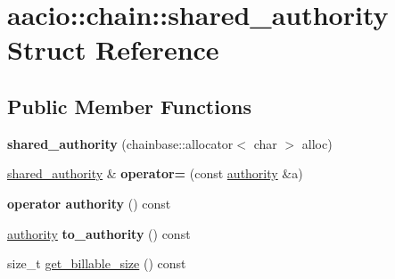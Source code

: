 \hypertarget{structaacio_1_1chain_1_1shared__authority}{}\section{aacio\+:\+:chain\+:\+:shared\+\_\+authority Struct Reference}
\label{structaacio_1_1chain_1_1shared__authority}
\subsection*{Public Member Functions}
\begin{DoxyCompactItemize}
\item 
\mbox{\label{structaacio_1_1chain_1_1shared__authority_a07b251036ed4de19aadd3fe8bc2841b3}} 
{\bfseries shared\+\_\+authority} (chainbase\+::allocator$<$ char $>$ alloc)
\item 
\mbox{\label{structaacio_1_1chain_1_1shared__authority_a15e223799ae703fc71f5582abfd138a2}} 
\mbox{\hyperlink{structaacio_1_1chain_1_1shared__authority}{shared\+\_\+authority}} \& {\bfseries operator=} (const \mbox{\hyperlink{structaacio_1_1chain_1_1authority}{authority}} \&a)
\item 
\mbox{\label{structaacio_1_1chain_1_1shared__authority_a7f5e966c8db89e8b93f67e07a59aa622}} 
{\bfseries operator authority} () const
\item 
\mbox{\label{structaacio_1_1chain_1_1shared__authority_aa952f6c22d3f34b17f19675316da8aba}} 
\mbox{\hyperlink{structaacio_1_1chain_1_1authority}{authority}} {\bfseries to\+\_\+authority} () const
\item 
size\+\_\+t \mbox{\hyperlink{structaacio_1_1chain_1_1shared__authority_a3077b76ccc143ccbaf24054a71ffe9a4}{get\+\_\+billable\+\_\+size}} () const
\end{DoxyCompactItemize}
